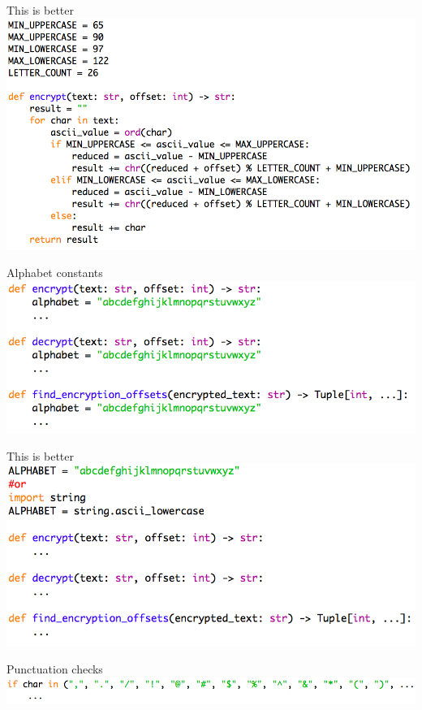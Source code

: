 \documentclass[week2]{csse1001}
\begin{document}
\begin{topic}{This is better}
\includegraphics[width=\textwidth]{a1pitfalls/constants}
\end{topic}

\begin{topic}{Alphabet constants}
\includegraphics[width=\textwidth]{a1pitfalls/alphabad}
\end{topic}

\begin{topic}{This is better}
\includegraphics[width=\textwidth]{a1pitfalls/alphagood}
\end{topic}

\begin{topic}{Punctuation checks}
\includegraphics[width=\textwidth]{a1pitfalls/punctubad}
\end{topic}
\end{document}
